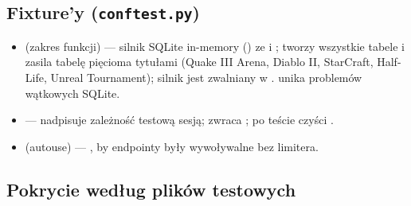 \subsection{Fixture'y (\texttt{conftest.py})}

\begin{itemize}
  \item {} (zakres funkcji) --- silnik SQLite in-memory () ze  i ; tworzy wszystkie tabele i zasila tabelę  pięcioma tytułami (Quake III Arena, Diablo II, StarCraft, Half-Life, Unreal Tournament); silnik jest zwalniany w .  unika problemów wątkowych SQLite.
  \item {} --- nadpisuje zależność  testową sesją; zwraca ; po teście czyści .
  \item {} (autouse) --- , by endpointy były wywoływalne bez limitera.
\end{itemize}

\subsection{Pokrycie według plików testowych}

